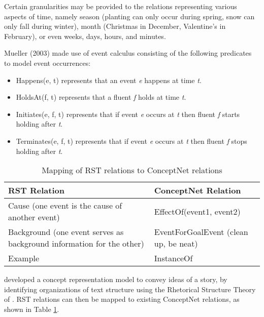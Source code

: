 Certain granularities may be provided to the relations representing various aspects of time, namely season (planting can only occur during spring, snow can only fall during winter), month (Christmas in December, Valentine's in February), or even weeks, days, hours, and minutes.

Mueller (2003) made use of event calculus consisting of the following predicates to model event occurrences:

\begin{itemize}
	\item Happens(e, t) represents that an event \emph{e} happens at time \emph{t}.
	\item HoldsAt(f, t) represents that a fluent \emph{f} holds at time \emph{t}.
	\item Initiates(e, f, t) represents that if event \emph{e} occurs at \emph{t} then fluent \emph{f} starts holding after \emph{t}.
	\item Terminates(e, f, t) represents that if event \emph{e} occurs at \emph{t} then fluent \emph{f} stops holding after \emph{t}.
\end{itemize}

\begin{table}[ht]   %
\centering
\caption{Mapping of RST relations to ConceptNet relations} \vspace{0.25em}
\begin{tabular}{|p{7cm}|l|} \hline
RST Relation & ConceptNet Relation \\ \hline
Cause (one event is the cause of another event) & EffectOf(event1, event2) \\ \hline
Background (one event serves as background information for the other) & EventForGoalEvent (clean up, be neat) \\ \hline
Example & InstanceOf \\ \hline
\end{tabular}
\label{tab:mappingrstconceptnet}
\end{table}

 developed a concept representation model to convey ideas of a story, by identifying organizations of text structure using the Rhetorical Structure Theory of . RST relations can then be mapped to existing ConceptNet relations, as shown in Table \ref{tab:mappingrstconceptnet}.






